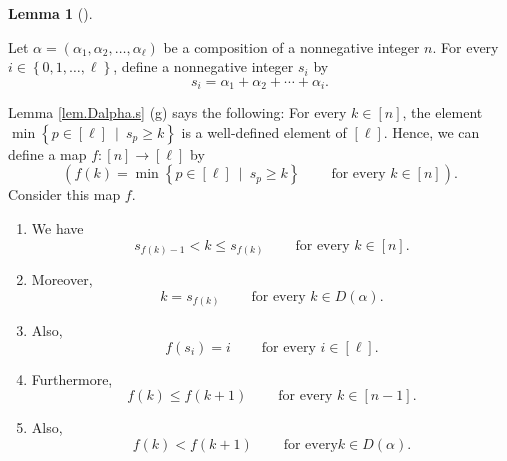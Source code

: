 \documentclass[numbers=enddot,12pt,final,onecolumn,notitlepage,abstracton]{scrartcl}
\theoremstyle{definition}
\newtheorem{lem}[theo]{Lemma}
\newenvironment{lemma}[1][]
{\begin{lem}[#1]\begin{leftbar}}
{\end{leftbar}\end{lem}}
\newenvironment{verlong}{}{}
\begin{document}
\begin{verlong}
\begin{footnotesize}
\begin{lemma}
\label{lem.Dalpha.s2}Let $\alpha=\left(  \alpha_{1},\alpha_{2},\ldots
,\alpha_{\ell}\right)  $ be a composition of a nonnegative integer $n$. For
every $i\in\left\{  0,1,\ldots,\ell\right\}  $, define a nonnegative integer
$s_{i}$ by
\[
s_{i}=\alpha_{1}+\alpha_{2}+\cdots+\alpha_{i}.
\]


Lemma \ref{lem.Dalpha.s} (g) says the following: For every $k\in\left[
n\right]  $, the element $\min\left\{  p\in\left[  \ell\right]  \ \mid
\ s_{p}\geq k\right\}  $ is a well-defined element of $\left[  \ell\right]  $.
Hence, we can define a map $f:\left[  n\right]  \rightarrow\left[
\ell\right]  $ by%
\[
\left(  f\left(  k\right)  =\min\left\{  p\in\left[  \ell\right]
\ \mid\ s_{p}\geq k\right\}  \ \ \ \ \ \ \ \ \ \ \text{for every }k\in\left[
n\right]  \right)  .
\]
Consider this map $f$.

\begin{enumerate}
\item[(a)] We have
\begin{equation}
s_{f\left(  k\right)  -1}<k\leq s_{f\left(  k\right)  }%
\ \ \ \ \ \ \ \ \ \ \text{for every }k\in\left[  n\right]  .
\label{pf.prop.Malpha.D.f.1}%
\end{equation}


\item[(b)] Moreover,%
\begin{equation}
k=s_{f\left(  k\right)  }\ \ \ \ \ \ \ \ \ \ \text{for every }k\in D\left(
\alpha\right)  . \label{pf.prop.Malpha.D.f.4}%
\end{equation}


\item[(c)] Also,%
\begin{equation}
f\left(  s_{i}\right)  =i\ \ \ \ \ \ \ \ \ \ \text{for every }i\in\left[
\ell\right]  . \label{pf.prop.Malpha.D.f.7}%
\end{equation}


\item[(d)] Furthermore,%
\begin{equation}
f\left(  k\right)  \leq f\left(  k+1\right)  \ \ \ \ \ \ \ \ \ \ \text{for
every }k\in\left[  n-1\right]  . \label{pf.prop.Malpha.D.f.2}%
\end{equation}


\item[(e)] Also,%
\begin{equation}
f\left(  k\right)  <f\left(  k+1\right)  \ \ \ \ \ \ \ \ \ \ \text{for every
}k\in D\left(  \alpha\right)  . \label{pf.prop.Malpha.D.f.3}%
\end{equation}



\end{enumerate}
\end{lemma}
\end{footnotesize}
\end{verlong}
\end{document}

